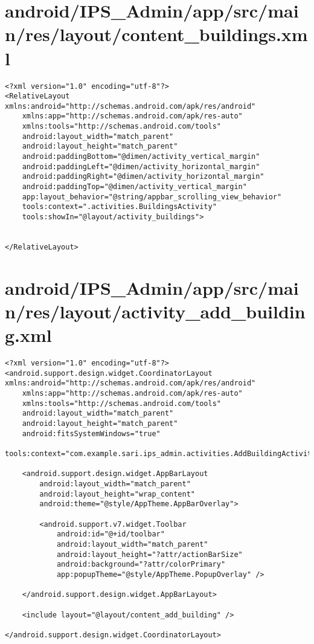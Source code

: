\section{android/IPS\_Admin/app/src/main/res/layout/content_buildings.xml}
\begin{lstlisting}<?xml version="1.0" encoding="utf-8"?>
<RelativeLayout xmlns:android="http://schemas.android.com/apk/res/android"
    xmlns:app="http://schemas.android.com/apk/res-auto"
    xmlns:tools="http://schemas.android.com/tools"
    android:layout_width="match_parent"
    android:layout_height="match_parent"
    android:paddingBottom="@dimen/activity_vertical_margin"
    android:paddingLeft="@dimen/activity_horizontal_margin"
    android:paddingRight="@dimen/activity_horizontal_margin"
    android:paddingTop="@dimen/activity_vertical_margin"
    app:layout_behavior="@string/appbar_scrolling_view_behavior"
    tools:context=".activities.BuildingsActivity"
    tools:showIn="@layout/activity_buildings">


</RelativeLayout>
\end{lstlisting}
\newpage
\section{android/IPS\_Admin/app/src/main/res/layout/activity_add_building.xml}
\begin{lstlisting}<?xml version="1.0" encoding="utf-8"?>
<android.support.design.widget.CoordinatorLayout xmlns:android="http://schemas.android.com/apk/res/android"
    xmlns:app="http://schemas.android.com/apk/res-auto"
    xmlns:tools="http://schemas.android.com/tools"
    android:layout_width="match_parent"
    android:layout_height="match_parent"
    android:fitsSystemWindows="true"
    tools:context="com.example.sari.ips_admin.activities.AddBuildingActivity">

    <android.support.design.widget.AppBarLayout
        android:layout_width="match_parent"
        android:layout_height="wrap_content"
        android:theme="@style/AppTheme.AppBarOverlay">

        <android.support.v7.widget.Toolbar
            android:id="@+id/toolbar"
            android:layout_width="match_parent"
            android:layout_height="?attr/actionBarSize"
            android:background="?attr/colorPrimary"
            app:popupTheme="@style/AppTheme.PopupOverlay" />

    </android.support.design.widget.AppBarLayout>

    <include layout="@layout/content_add_building" />

</android.support.design.widget.CoordinatorLayout>
\end{lstlisting}
\newpage

